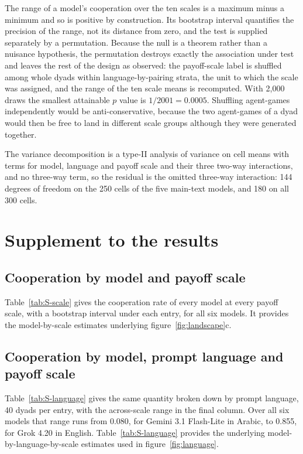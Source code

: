 \documentclass[openacc]{rsproca_new}
\begin{document}
The range of a model's cooperation over the ten scales is a maximum minus a
minimum and so is positive by construction. Its bootstrap interval quantifies
the precision of the range, not its distance from zero, and the test is
supplied separately by a permutation. Because the null is a theorem rather than
a nuisance hypothesis, the permutation destroys exactly the association under
test and leaves the rest of the design as observed: the payoff-scale label is
shuffled among whole dyads within language-by-pairing strata, the unit to which
the scale was assigned, and the range of the ten scale means is recomputed.
With 2{,}000 draws the smallest attainable $p$ value is $1/2001 = 0.0005$.
Shuffling agent-games independently would be anti-conservative, because the two
agent-games of a dyad would then be free to land in different scale groups
although they were generated together.

The variance decomposition is a type-II analysis of variance on cell means with
terms for model, language and payoff scale and their three two-way
interactions, and no three-way term, so the residual is the omitted three-way
interaction: 144 degrees of freedom on the 250 cells of the five main-text
models, and 180 on all 300 cells.


\section{Supplement to the results}\label{appendix:results}

\subsection{Cooperation by model and payoff scale}\label{appendix:by_scale}

Table~\ref{tab:S-scale} gives the cooperation rate of every model at every
payoff scale, with a bootstrap interval under each entry, for all six models.
It provides the model-by-scale estimates underlying figure~\ref{fig:landscape}c.

\subsection{Cooperation by model, prompt language and payoff scale}\label{appendix:by_language}

Table~\ref{tab:S-language} gives the same quantity broken down by prompt
language, 40 dyads per entry, with the across-scale range in the final column.
Over all six models that range runs from 0.080, for Gemini 3.1 Flash-Lite in
Arabic, to 0.855, for Grok 4.20 in English. Table~\ref{tab:S-language}
provides the underlying model-by-language-by-scale estimates used in
figure~\ref{fig:language}.
\end{document}
